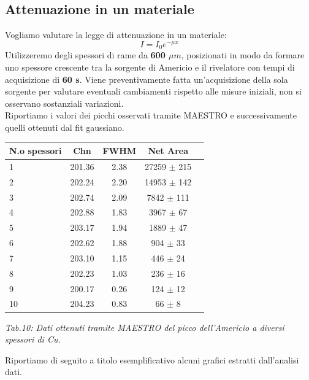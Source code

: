 \documentclass[a4paper]{article}
\begin{document}
\subsection{Attenuazione in un materiale}
Vogliamo valutare la legge di attenuazione in un materiale:
\begin{equation}
I=I_{0}e^{-\mu x}
\end{equation}
Utilizzeremo degli spessori di rame da \textbf{600 $\mu m$}, posizionati in modo da formare uno spessore crescente tra la sorgente di Americio e il rivelatore con tempi di acquisizione di \textbf{60 s}. Viene preventivamente fatta un'acquisizione della sola sorgente per valutare eventuali cambiamenti rispetto alle misure iniziali, non si osservano sostanziali variazioni.\\

Riportiamo i valori dei picchi osservati tramite MAESTRO e successivamente quelli ottenuti dal fit gaussiano.

\begin{center} 
		
		\begin{tabular}{lcccc}
			\hline
			\hline
			\textbf{N.o spessori} & \textbf{Chn}  &   \textbf{FWHM}   & \textbf{Net Area}	\\
			\hline
			\hline
				      1 &  201.36   & 2.38  &  27259	$\pm$	215	\\
				      2 &  202.24   & 2.20	&  14953	$\pm$	142 \\
				      3 &  202.74	& 2.09	&  7842		$\pm$	111 \\
				      4 &  202.88	& 1.83	&  3967	$\pm$	67 \\
				      5 &  203.17	& 1.94	&  1889	$\pm$	47 \\
				      6 &  202.62	& 1.88	&  904	$\pm$	33 \\
				      7 &  203.10	& 1.15	&  446	$\pm$	24 \\
				      8 &  202.23	& 1.03	&  236	$\pm$	16 \\
				      9 &  200.17	& 0.26	&  124	$\pm$	12 \\
				      10 & 204.23	& 0.83	&  66	$\pm$	8 \\
			\hline
			\hline
		\end{tabular}
		\linebreak
		\emph{Tab.10: Dati ottenuti tramite MAESTRO del picco dell'Americio a diversi spessori di Cu.} 
\end{center}
 Riportiamo di seguito a titolo esemplificativo alcuni grafici estratti dall'analisi dati.
 
\end{document}
